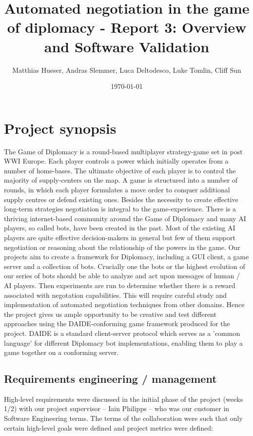 \documentclass[11pt]{article}
\title{Automated negotiation in the game of diplomacy - Report 3: Overview and Software Validation}
\author{Matthias Hueser, Andras Slemmer, Luca Deltodesco, Luke Tomlin, Cliff Sun}
\date{\today}
\begin{document}
\maketitle

\section{Project synopsis}
The Game of Diplomacy is a round-based multiplayer strategy-game set in post WWI
Europe. Each player controls a power which initially operates from a number of 
home-bases. The ultimate objective of each player is to control the majority of
supply-centers on the map. A game is structured into a number of rounds, in which
each player formulates a move order to conquer additional supply centres or
defend existing ones. Besides the necessity to create effective long-term
strategies negotiation is integral to the game-experience. There is a thriving
internet-based community around the Game of Diplomacy and many AI players, so
called bots, have been created in the past. Most of the existing AI players are
quite effective decision-makers in general but few of them support negotiation
or reasoning about the relationship of the powers in the game. Our projects aim
to create a framework for Diplomacy, including a GUI client, a game server and a
collection of bots. Crucially one the bots or the highest evolution of our series
of bots should be able to analyze and act upon messages of human / AI players.
Then experiments are run to determine whether there is a reward associated with
negotation capabilities. This will require careful study and implementation of
automated negotiation techniques from other domains. Hence the project gives us
ample opportunity to be creative and test different approaches using the
DAIDE-conforming game framework produced for the project. DAIDE is a standard
client-server protocol which serves as a 'common language' for different Diplomacy
bot implementations, enabling them to play a game together on a conforming
server.

\subsection{Requirements engineering / management}
High-level requirements were discussed in the initial phase of the project 
(weeks 1/2) with our project supervisor -- Iain Philipps -- who was our customer
in Software Engineering terms. The terms of the collaboration were such that 
only certain high-level goals were defined and project metrics were defined: 
\end{document}
